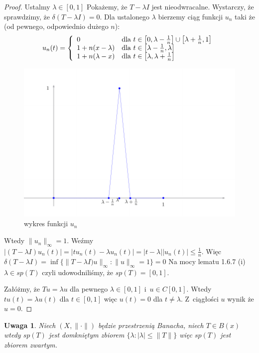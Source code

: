 \documentclass[11pt]{mwrep}
\renewcommand{\[}{\begin{equation}}
\renewcommand{\]}{\end{equation}}
\newcommand{\norm}{\|\cdot\|}
\newcommand{\spac}[1][X]{$(#1,\norm)$ }
\newtheorem{uwaga}[subsection]{Uwaga}
\begin{document}
\begin{proof}
	Ustalmy $\lambda \in [0,1]$ Pokażemy, że $T -\lambda I$ jest nieodwracalne. Wystarczy, że sprawdzimy, że $\delta(T-\lambda I) =0$.
	Dla ustalonego $\lambda$ bierzemy ciąg funkcji $u_n$ taki że (od pewnego, odpowiednio dużego $n$):
	$$u_n(t) = \left\{
		\begin{array}[]{ll}
		 	0 & \textrm{dla } t \in \left[0,\lambda-\frac{1}{n}\right] \cup \left[ \lambda+\frac{1}{n}, 1 \right]\\
			1 + n(x -\lambda) & \textrm{dla } t \in \left[ \lambda-\frac{1}{n},\lambda \right]\\
			1+n(\lambda -x)	& \textrm{dla } t \in \left[ \lambda,\lambda+\frac{1}{n} \right]
		\end{array}\right.
	$$
	\begin{figure}[h]
	  \centering
	  \includegraphics[scale=.7]{rys2}
	  \caption{wykres funkcji $u_n$}
	\end{figure}

	Wtedy $\|u_n\|_\infty=1$. Weźmy $|(T- \lambda I) u_n(t)| = |tu_n(t) - \lambda u_n(t)| = |t-\lambda| |u_n(t)| \le \frac{1}{n}$.
	Więc $\delta(T-\lambda I)  = \inf \{ \|T-\lambda I )u \|_\infty : \|u\|_\infty =1\} = 0$ 
	Na mocy lematu 1.6.7 (i) $\lambda \in sp(T)$ czyli udowodniliśmy, że $sp(T) = [0,1]$. \par
	Załóżmy, że $Tu = \lambda u$ dla pewnego $\lambda \in [0,1]$ i~$u \in C[0,1]$.
	Wtedy $tu(t) = \lambda u(t) $ dla $t\in[0,1]$ więc $u(t) = 0$ dla $t\not = \lambda$. Z~ciągłości $u$ wynik że $u=0$.
\end{proof}
\begin{uwaga}
	Niech \spac będzie przestrzenią Banacha, niech $T\in B(x)$ wtedy $sp (T)$ jest domkniętym zbiorem 
	$\{\lambda : |\lambda| \le \|T\|\}$ więc $sp(T)$ jest zbiorem zwartym.
\end{uwaga}
\end{document}
